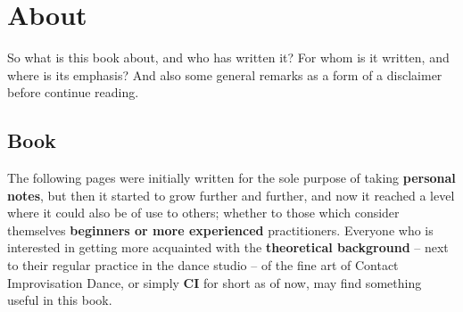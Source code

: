 \chapter{About}\label{ch:about}



So what is this book about, and who has written it?
For whom is it written, and where is its emphasis?
And also some general remarks as a form of a disclaimer before continue reading.

\section{Book}\label{sec:book}

The following pages were initially written for the sole purpose of taking \textbf{personal notes}, but then it started to grow further and further, and now it reached a level where it could also be of use to others; whether to those which consider themselves \textbf{beginners or more experienced} practitioners.
Everyone who is interested in getting more acquainted with the \textbf{theoretical background} -- next to their regular practice in the dance studio -- of the fine art of Contact Improvisation Dance, or simply \textbf{CI} for short as of now, may find something useful in this book.


